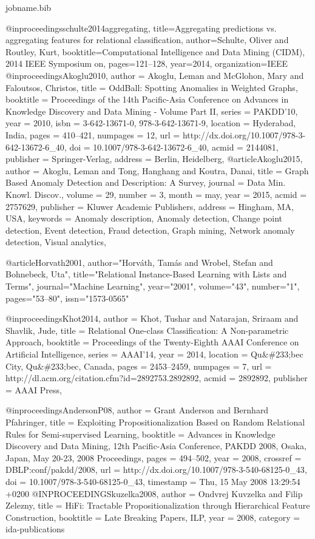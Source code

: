 {\begin{filecontents*}{jobname.bib}
	
	@inproceedings{schulte2014aggregating,
		title={Aggregating predictions vs. aggregating features for relational classification},
		author={Schulte, Oliver and Routley, Kurt},
		booktitle={Computational Intelligence and Data Mining (CIDM), 2014 IEEE Symposium on},
		pages={121--128},
		year={2014},
		organization={IEEE}
	}
	@inproceedings{Akoglu2010,
		author = {Akoglu, Leman and McGlohon, Mary and Faloutsos, Christos},
		title = {OddBall: Spotting Anomalies in Weighted Graphs},
		booktitle = {Proceedings of the 14th Pacific-Asia Conference on Advances in Knowledge Discovery and Data Mining - Volume Part II},
		series = {PAKDD'10},
		year = {2010},
		isbn = {3-642-13671-0, 978-3-642-13671-9},
		location = {Hyderabad, India},
		pages = {410--421},
		numpages = {12},
		url = {http://dx.doi.org/10.1007/978-3-642-13672-6_40},
		doi = {10.1007/978-3-642-13672-6_40},
		acmid = {2144081},
		publisher = {Springer-Verlag},
		address = {Berlin, Heidelberg},
	} 
	@article{Akoglu2015,
		author = {Akoglu, Leman and Tong, Hanghang and Koutra, Danai},
		title = {Graph Based Anomaly Detection and Description: A Survey},
		journal = {Data Min. Knowl. Discov.},
		volume = {29},
		number = {3},
		month = may,
		year = {2015},
		acmid = {2757629},
		publisher = {Kluwer Academic Publishers},
		address = {Hingham, MA, USA},
		keywords = {Anomaly description, Anomaly detection, Change point detection, Event detection, Fraud detection, Graph mining, Network anomaly detection, Visual analytics},
	} 
	
	@article{Horvath2001,
		author="Horv{\'a}th, Tam{\'a}s
		and Wrobel, Stefan
		and Bohnebeck, Uta",
		title="Relational Instance-Based Learning with Lists and Terms",
		journal="Machine Learning",
		year="2001",
		volume="43",
		number="1",
		pages="53--80",
		issn="1573-0565"
	}
	
	@inproceedings{Khot2014,
		author = {Khot, Tushar and Natarajan, Sriraam and Shavlik, Jude},
		title = {Relational One-class Classification: A Non-parametric Approach},
		booktitle = {Proceedings of the Twenty-Eighth AAAI Conference on Artificial Intelligence},
		series = {AAAI'14},
		year = {2014},
		location = {Qu\&\#233;bec City, Qu\&\#233;bec, Canada},
		pages = {2453--2459},
		numpages = {7},
		url = {http://dl.acm.org/citation.cfm?id=2892753.2892892},
		acmid = {2892892},
		publisher = {AAAI Press},
	} 
	
	@inproceedings{AndersonP08,
		author    = {Grant Anderson and
			Bernhard Pfahringer},
		title     = {Exploiting Propositionalization Based on Random Relational Rules for
			Semi-supervised Learning},
		booktitle = {Advances in Knowledge Discovery and Data Mining, 12th Pacific-Asia
			Conference, {PAKDD} 2008, Osaka, Japan, May 20-23, 2008 Proceedings},
		pages     = {494--502},
		year      = {2008},
		crossref  = {DBLP:conf/pakdd/2008},
		url       = {http://dx.doi.org/10.1007/978-3-540-68125-0_43},
		doi       = {10.1007/978-3-540-68125-0_43},
		timestamp = {Thu, 15 May 2008 13:29:54 +0200}
	}
	@INPROCEEDINGS{kuzelka2008,
		author = {Ondvrej Kuvzelka and Filip Zelezny},
		title = {HiFi: Tractable Propositionalization through Hierarchical Feature
			Construction},
		booktitle = {Late Breaking Papers, ILP},
		year = {2008},
		category = {ida-publications}
	}
	

\end{filecontents*}}
